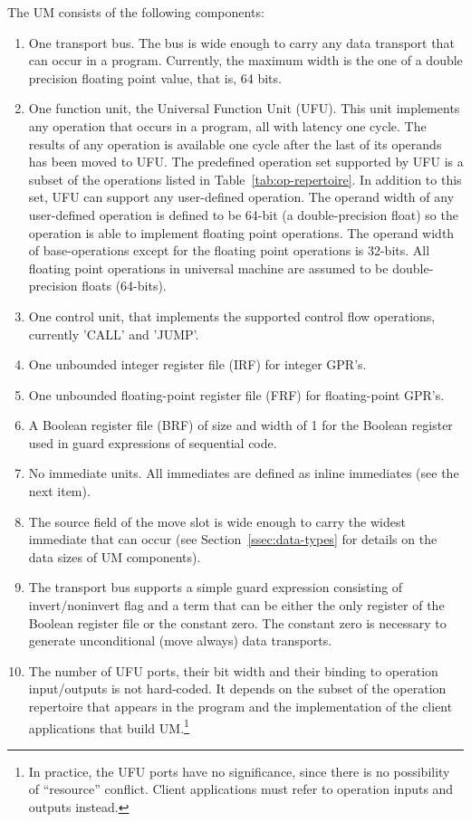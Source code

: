 \documentclass[twoside]{tce}
\begin{document}
The UM consists of the following components:
\begin{enumerate}
\item %
  One transport bus.  The bus is wide enough to carry any data transport
  that can occur in a program. Currently, the maximum width is the one
  of a double precision floating point value, that is, 64 bits.
\item %
  One function unit, the Universal Function Unit (UFU).
  This unit implements any operation that occurs in a program, all with
  latency one cycle.  The results of any operation is available one cycle
  after the last of its operands has been moved to UFU.  The predefined
  operation set supported by UFU is a subset of the operations listed in
  Table~\ref{tab:op-repertoire}.  In addition to this set, UFU can support
  any user-defined operation. The operand width of any user-defined
  operation is defined to be 64-bit (a double-precision float) so the
  operation is able to implement floating point operations. The operand
  width of base-operations except for the floating point operations is
  32-bits. All floating point operations in universal machine are assumed
  to be double-precision floats (64-bits).
\item %
  One control unit, that implements the supported control flow operations,
  currently 'CALL' and 'JUMP'.
\item %
  One unbounded integer register file (IRF) for integer GPR's.
\item %
  One unbounded floating-point register file (FRF) for floating-point GPR's.
\item %
  A Boolean register file (BRF) of size and width of 1 for the Boolean
  register used in guard expressions of sequential code.
\item %
  No immediate units. All immediates are defined as inline immediates
  (see the next item).
\item %
  The source field of the move slot is wide enough to carry the widest
  immediate that can occur (see Section~\ref{ssec:data-types} for details on
  the data sizes of UM components).
\item %
  The transport bus supports a simple guard expression consisting of
  invert/noninvert flag and a term that can be either the only register of
  the Boolean register file or the constant zero.  The constant zero is
  necessary to generate unconditional (move always) data transports.
\item %
  The number of UFU ports, their bit width and their binding to operation
  input/outputs is not hard-coded.  It depends on the subset of the operation
  repertoire that appears in the program and the implementation of the
  client applications that build UM.\footnote{
%
    In practice, the UFU ports have no significance, since there is no
    possibility of ``resource'' conflict.  Client applications must refer to
    operation inputs and outputs instead.}
\end{enumerate}
\end{document}
